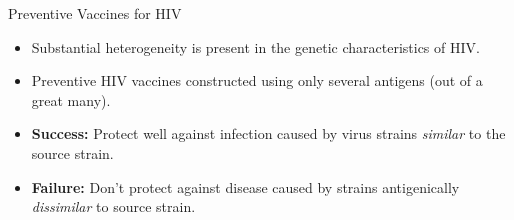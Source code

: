 \documentclass[12pt,t]{beamer}
\begin{document}
\begin{frame}[c]{Preventive Vaccines for HIV}

\begin{center}
\begin{itemize}
  \itemsep10pt
  \item Substantial heterogeneity is present in the genetic characteristics of
    HIV.
  \item Preventive HIV vaccines constructed using only several antigens (out of
    a great many).
  \item \textbf{Success:} Protect well against infection caused by virus strains
    \textit{similar} to the source strain.
  \item \textbf{Failure:} Don't protect against disease caused by strains
    antigenically \textit{dissimilar} to source strain.
\end{itemize}
\end{center}


\end{frame}

\end{document}
